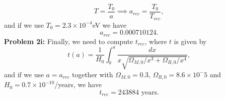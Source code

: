 \documentclass[11pt]{article}
\begin{document}
\begin{displaymath}
  T=\frac{T_0}{a}\implies a_{rec} = \frac{T_0}{T_{rec}},
\end{displaymath}
and if we use $T_0 = 2.3\times 10^{-4}$eV we have
\begin{displaymath}
  a_{rec} = 0.000710124.
\end{displaymath}
\newline
\textbf{Problem 2i:} Finally, we need to compute $t_{rec}$, where $t$ is given by
\begin{displaymath}
  t(a) = \frac{1}{H_0}\int_{0}^{a} \frac{dx}{x\sqrt{\Omega_{M,0}/x^3 + \Omega_{R,0}/x^4}},
\end{displaymath}
and if we use $a = a_{rec}$ together with $\Omega_{M,0} = 0.3$, $\Omega_{R,0}=8.6\times 10^-5$ and $H_0=0.7\times 10^{-10}$/years, we have
\begin{displaymath}
  t_{rec} = 243884 \text{ years}.
\end{displaymath}
\end{document}
